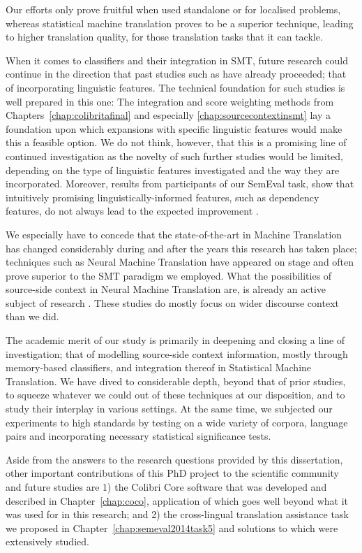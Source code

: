 Our efforts only prove fruitful when used standalone or for localised problems,
whereas statistical machine translation proves to be a superior technique,
leading to higher translation quality, for those translation tasks that it can
tackle.

When it comes to classifiers and their integration in SMT, future research could continue in the direction that
past studies such as \cite{Rejwanul+11} have already proceeded; that of incorporating linguistic
features. The technical foundation for such studies is well prepared in this one: The integration and score weighting methods from Chapters~\ref{chap:colibritafinal} and especially
\ref{chap:sourcecontextinsmt} lay a foundation upon which expansions with specific linguistic features would make this a
feasible option. We do not think, however, that this is a promising line of continued investigation as the
novelty of such further studies would be limited, depending on the type of linguistic features
investigated and the way they are incorporated. Moreover, results from participants of our SemEval task, show
that intuitively promising linguistically-informed features, such as dependency features, do not always lead to the
expected improvement \citep{UNAL,IUCL}.

We especially have to concede that the state-of-the-art in Machine Translation has changed considerably during and after
the years this research has taken place; techniques such as Neural Machine Translation have appeared on stage and often
prove superior to the SMT paradigm we employed. What the possibilities of source-side context in Neural Machine
Translation are, is already an active subject of research \citep{Jean+17,Wang+17,Bawden+17,Maruf+17}. These studies
do mostly focus on wider discourse context than we did.

The academic merit of our study is primarily in deepening and closing a line of investigation; that of modelling
source-side context information, mostly through memory-based classifiers, and integration thereof in Statistical Machine
Translation. We have dived to considerable depth, beyond that of prior studies, to
squeeze whatever we could out of these techniques at our disposition, and to study their interplay in various settings.
At the same time, we subjected our experiments to high standards by testing on a wide variety of corpora, language pairs and incorporating necessary statistical significance tests.

Aside from the answers to the research questions provided by this dissertation, other important contributions of this
PhD project to the scientific community and future studies are 1) the Colibri Core software that was developed and
described in Chapter~\ref{chap:coco}, application of which goes well beyond what it was used for in this research; and
2) the cross-lingual translation assistance task we proposed in Chapter~\ref{chap:semeval2014task5} and solutions to
which were extensively studied.



